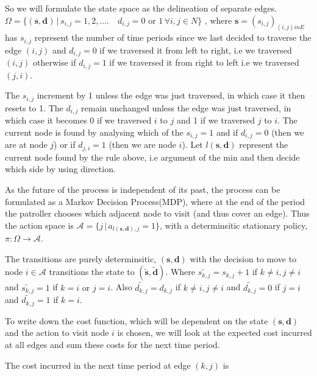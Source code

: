 \documentclass[a4paper,10pt]{article}
\theoremstyle{definition}
\theoremstyle{definition}
\theoremstyle{remark}
\theoremstyle{definition}
\begin{document}
So we will formulate the state space as the delineation of separate edges. $\Omega=\{ (\bm{s},\bm{d}) \, | \, s_{i,j}=1,2,....  \quad d_{i,j}=0 \text{ or } 1 \, \forall i,j \in N \}$ , where $\bm{s}=(s_{i,j})_{(i,j) in E}$ has $s_{i,j}$ represent the number of time periods since we last decided to traverse the edge $(i,j)$ and $d_{i,j}=0$ if we traversed it from left to right, i.e we traversed $(i,j)$ otherwise if $d_{i,j}=1$ if we traversed it from right to left i.e we traversed $(j,i)$.

The $s_{i,j}$ increment by 1 unless the edge was just traversed, in which case it then resets to 1. The $d_{i,j}$ remain unchanged unless the edge was just traversed, in which case it becomes 0 if we traversed $i$ to $j$ and 1 if we traversed $j$ to $i$. The current node is found by analysing which of the $s_{i,j}=1$ and if $d_{i,j}=0$ (then we are at node $j$) or if $d_{j,i}=1$ (then we are node $i$). Let $l(\bm{s},\bm{d})$ represent the current node found by the rule above, i.e argument of the min and then decide which side by using direction.

As the future of the process is independent of its past, the process can be formulated as a Markov Decision Process(MDP), where at the end of the period the patroller chooses which adjacent node to visit (and thus cover an edge). Thus the action space is $\mathcal{A}=\{ j \, | \, a_{l(\bm{s},\bm{d}),j}=1 \}$, with a determinsitic stationary policy, $\pi : \Omega \rightarrow \mathcal{A}$.

The transitions are purely determinsitic, $(\bm{s},\bm{d})$ with the decision to move to node $i \in \mathcal{A}$ transitions the state to $(\widetilde{\bm{s}},\widetilde{\bm{d}})$. Where $\widetilde{s_{k,j}}=s_{k,j}+1$ if $k \neq i,j \neq i$ and $\widetilde{s_{k,j}}=1$ if $k=i \text{ or } j=i$. Also $\widetilde{d_{k,j}}=d_{k,j}$ if $k \neq i, j \neq i$ and $\widetilde{d_{k,j}}=0$ if $j=i$ and $\widetilde{d_{k,j}}=1$ if $k=i$.

To write down the cost function, which will be dependent on the state $(\bm{s},\bm{d})$ and the action to visit node $i$ is chosen, we will look at the expected cost incurred at all edges and sum these costs for the next time period.

The cost incurred in the next time period at edge $(k,j)$ is
\end{document}

